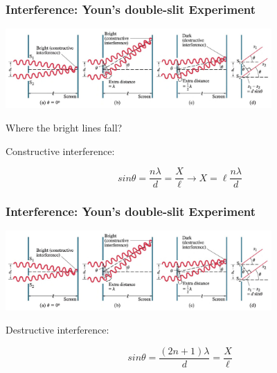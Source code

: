 \documentclass[]{beamer}
\begin{document}


\begin{frame}

\frametitle{Interference: Youn's double-slit Experiment}

  \begin{center}
  \includegraphics[height=1.2in]{images5/doubleslit2.jpg}
\end{center}


Where the bright lines fall?

\vspace{3mm}

Constructive interference:

\vspace{3mm}

\begin{equation}
 sin\theta=\frac{n\lambda}{d}=\frac{X}{\ell}\rightarrow X=\ell \frac{n\lambda}{d}
\end{equation}


  \end{frame}





\begin{frame}

\frametitle{Interference: Youn's double-slit Experiment}

  \begin{center}
  \includegraphics[height=1.2in]{images5/doubleslit2.jpg}
\end{center}


\pause


Destructive interference:
\pause
\vspace{3mm}

\begin{equation}
 sin\theta=\frac{(2n+1)\lambda}{d}=\frac{X}{\ell}
\end{equation}

  \end{frame}
\end{document}
